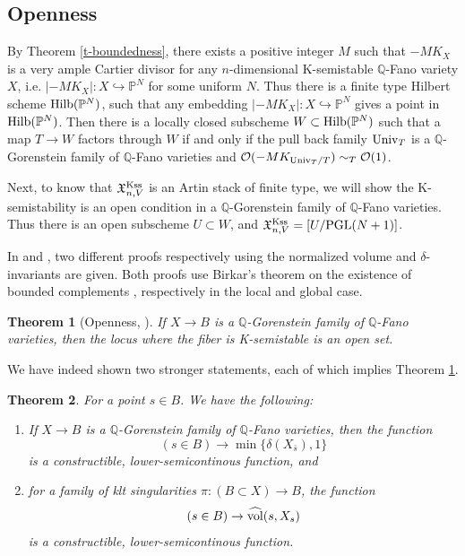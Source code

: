 \documentclass[12pt,reqno]{amsart}%
\newcommand{\PP}{{\mathbb{P} }}
\newtheorem{thm}{Theorem}[section]
\theoremstyle{definition}
\theoremstyle{remark}
\newcommand{\hvol}{\widehat{\rm vol}}
\newcommand{\bQ}{{\mathbb{Q}}}
\begin{document}
\subsection{Openness}\label{ss-openness}
By Theorem \ref{t-boundedness}, there exists a positive integer $M$ such that $-MK_{X}$ is a very ample Cartier divisor for any $n$-dimensional K-semistable $\mathbb Q$-Fano variety $X$, i.e. 
$|-MK_X|\colon X\hookrightarrow \mathbb P^N$ for some uniform $N$. 
Thus there is a finite type Hilbert scheme ${\rm Hilb}(\PP^N)$, such that any embedding $|-MK_X|\colon X\hookrightarrow \mathbb P^N$ gives a point in ${\rm Hilb}(\PP^N)$.
Then there is a locally closed subscheme $W\subset {\rm Hilb}(\PP^N)$ such that a map
$T\to W$ factors through $W$ if and only if the pull back family ${\rm Univ}_T$ is a $\mathbb Q$-Gorenstein family of $\mathbb{Q}$-Fano varieties and $\mathcal{O}(-MK_{{\rm Univ}_T/T})\sim_{T}\mathcal{O}(1)$. 

Next, to know that $\mathfrak{X}^{\rm Kss}_{n,V}$ is an Artin stack of finite type, we will show the K-semistability is an open condition in a $\bQ$-Gorenstein family of $\bQ$-Fano varieties. Thus there is an open subscheme $U\subset W$, and $\mathfrak{X}^{\rm Kss}_{n,V}=[U/{\rm PGL}(N+1)]$.

\medskip

 In \cite{Xu19} and \cite {BLX19}, two different proofs respectively using the normalized volume and $\delta$-invariants are given. Both proofs use Birkar's theorem on the existence of bounded complements \cite{Bir19}, respectively in the local and global case. 
\begin{thm}[{Openness, \cite{Xu19, BLX19}}]\label{t-openness}
If $X \to B$ is a $\mathbb{Q}$-Gorenstein family of $\mathbb{Q}$-Fano varieties, then the locus where the fiber is K-semistable is an open set. 
\end{thm} 

We have indeed shown two stronger statements, each of which implies Theorem \ref{t-openness}. %

\begin{thm}\label{t-constructible}
For a point $s\in B$. We have the following:
\begin{enumerate}
\item   If $X \to B$ is a $\mathbb{Q}$-Gorenstein family of $\mathbb{Q}$-Fano varieties, then the function 
$$(s\in B) \to \min\{\delta(X_{\bar{s}}),1\}$$ is a constructible, lower-semicontinous function, and
\item  for a family of klt singularities $\pi\colon (B\subset X)\to B$, the function 
$$(s\in B) \to \hvol({s}, X_{{s}})$$ is a constructible,  lower-semicontinous function. 
\end{enumerate}
\end{thm} 
\end{document}
